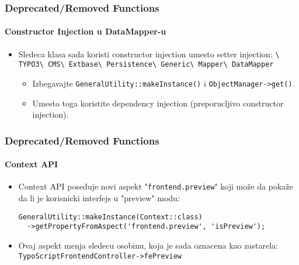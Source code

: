 \begin{frame}[fragile]
	\frametitle{Deprecated/Removed Functions}
	\framesubtitle{Constructor Injection u DataMapper-u}

	\begin{itemize}

		\item Sledeca klasa sada koristi constructor injection umesto setter injection:
			\smaller
				\texttt{\textbackslash
					TYPO3\textbackslash
					CMS\textbackslash
					Extbase\textbackslash
					Persistence\textbackslash
					Generic\textbackslash
					Mapper\textbackslash
					DataMapper}
			\normalsize

			\begin{itemize}\smaller
				\item[\ding{228}] Izbegavajte \texttt{GeneralUtility::makeInstance()} i \texttt{ObjectManager->get()}.
				\item[\ding{228}] Umesto toga koristite dependency injection (preporucljivo constructor injection).
			\end{itemize}\normalsize

	\end{itemize}

\end{frame}


\begin{frame}[fragile]
	\frametitle{Deprecated/Removed Functions}
	\framesubtitle{Context API}

	\lstset{basicstyle=\tiny\ttfamily}

	\begin{itemize}

		\item Context API poseduje novi aspekt "\texttt{frontend.preview}"
			koji može da pokaže da li je korisnicki interfejs u "preview" modu:

\begin{lstlisting}
GeneralUtility::makeInstance(Context::class)
  ->getPropertyFromAspect('frontend.preview', 'isPreview');
\end{lstlisting}

		\item Ovaj aspekt menja sledecu osobinu, koja je sada oznacena kao zastarela:
			\small\texttt{TypoScriptFrontendController->fePreview}\normalsize

	\end{itemize}

\end{frame}


